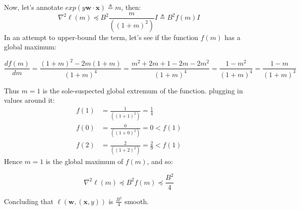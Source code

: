 Now, let's annotate $exp(y\boldsymbol{w}\cdot \boldsymbol{x}) \triangleq m$, then:
\begin{equation*}
\nabla^2 \ell(m) \preceq B^2 \frac{m}{((1+m)^2)} I \triangleq B^2 f(m) I
\end{equation*}
In an attempt to upper-bound the term, let's see if the function $f(m)$ has a global maximum:

\begin{equation*}
    \frac{df(m)}{dm} = \frac{(1+m)^2 - 2m(1+m)}{(1+m)^4} 
    = \frac{m^2 + 2m + 1 - 2m -2m^2}{(1+m)^4} = \frac{1- m^2}{(1+m)^4} = \frac{1-m}{(1+m)^3}
\end{equation*}

Thus $m=1$ is the sole-suspected global extremum of the function. plugging in values around it:
\begin{equation*}
    \begin{split}
        f(1) &= \frac{1}{((1+1)^2)} = \frac{1}{4} \\
        f(0) &= \frac{0}{((1+0)^2)} = 0 < f(1) \\
        f(2) &= \frac{2}{((1+2)^2)} = \frac{2}{9} < f(1)
    \end{split}
\end{equation*}
Hence $m=1$ is the global maximum of $f(m)$, and so:

\begin{equation*}
    \nabla^2 \ell(m) \preceq B^2 f(m) \preceq \frac{B^2}{4}
\end{equation*}

Concluding that $\ell(\boldsymbol{w}, (\boldsymbol{x}, y))$ is $\frac{B^2}{4}$ smooth.
